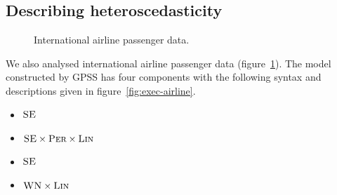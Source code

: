 \documentclass{article}
\begin{document}
\subsection{Describing heteroscedasticity}
\label{sec:airline}

\begin{figure}[h]
\centering
{}
\caption{
International airline passenger data.}
\label{fig:airline}
\end{figure}

We also analysed international airline passenger data (figure~\ref{fig:airline}).
The model constructed by GPSS has four components with the following syntax and descriptions given in figure~\ref{fig:exec-airline}.
\vspace{-0.5\baselineskip}
\begin{itemize}
  \itemsep0em
  \item ${\textsc{SE}}$
  \item ${\textsc{SE}} \times {\textsc{Per}} \times {\textsc{Lin}}$
  \item ${\textsc{SE}}$
  \item ${\textsc{WN}} \times {\textsc{Lin}}$
\end{itemize}
\vspace{-\baselineskip}
\end{document}
